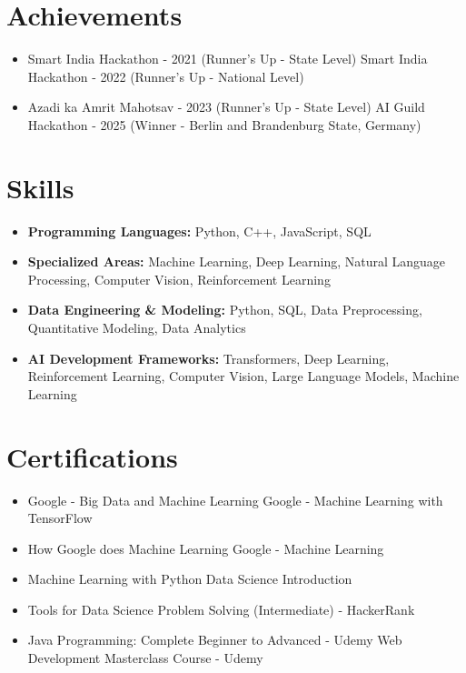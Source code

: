 \documentclass[a4paper,10pt]{article}
\begin{document}
\section*{Achievements}
\begin{itemize}
\item Smart India Hackathon - 2021 (Runner's Up - State Level) \hfill Smart India Hackathon - 2022 (Runner's Up - National Level)
\item Azadi ka Amrit Mahotsav - 2023 (Runner's Up - State Level) \hfill AI Guild Hackathon - 2025 (Winner - Berlin and Brandenburg State, Germany)
\end{itemize}

\section*{Skills}
\begin{itemize}
  \item \textbf{Programming Languages:} Python, C++, JavaScript, SQL
  \item \textbf{Specialized Areas:} Machine Learning, Deep Learning, Natural Language Processing, Computer Vision, Reinforcement Learning
  \item \textbf{Data Engineering \& Modeling:} Python, SQL, Data Preprocessing, Quantitative Modeling, Data Analytics
  \item \textbf{AI Development Frameworks:} Transformers, Deep Learning, Reinforcement Learning, Computer Vision, Large Language Models, Machine Learning
\end{itemize}

\section*{Certifications}
\begin{itemize}
\item Google - Big Data and Machine Learning \hfill Google - Machine Learning with TensorFlow
\item How Google does Machine Learning \hfill Google - Machine Learning
\item Machine Learning with Python \hfill Data Science Introduction
\item Tools for Data Science \hfill Problem Solving (Intermediate) - HackerRank
\item Java Programming: Complete Beginner to Advanced - Udemy \hfill Web Development Masterclass Course - Udemy
\end{itemize}
\end{document}

